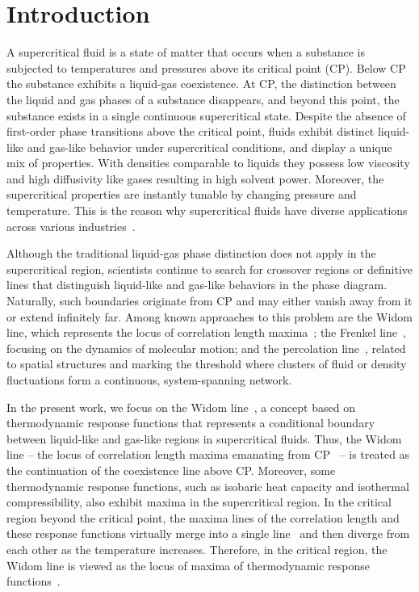 \section{Introduction}
A supercritical fluid is a state of matter that occurs when a substance is subjected to temperatures and pressures above its critical point (CP). Below CP the substance exhibits a liquid-gas coexistence. At CP, the distinction between the liquid and gas phases of a substance disappears, and beyond this point, the substance exists in a single continuous supercritical state. Despite the absence of first-order phase transitions above the critical point, fluids exhibit distinct liquid-like and gas-like behavior under supercritical conditions, and display a unique mix of properties. With densities comparable to liquids they possess low viscosity and high diffusivity like gases resulting in high solvent power. Moreover, the supercritical properties are instantly tunable by changing pressure and temperature. This is the reason why supercritical fluids have diverse applications across various industries~\cite{KMLetal14}.

Although the traditional liquid-gas phase distinction does not apply in the supercritical region, scientists continue to search for crossover regions or definitive lines that distinguish liquid-like and gas-like behaviors in the phase diagram. Naturally, such boundaries originate from CP and may either vanish away from it or extend infinitely far. Among known approaches to this problem are the Widom line, which represents the locus of correlation length maxima~\cite{FW69}; the Frenkel line~\cite{BGMetal17}, focusing on the dynamics of molecular motion; and the percolation line~\cite{CKS01}, related to spatial structures and marking the threshold where clusters of fluid or density fluctuations form a continuous, system-spanning network.

In the present work, we focus on the Widom line~\cite{XKBetal05,MS10,AKM17}, a concept based on thermodynamic response functions that represents a conditional boundary between liquid-like and gas-like regions in supercritical fluids. Thus, the Widom line \--- the locus of correlation length maxima emanating from CP~\cite{XKBetal05} \--- is treated as the continuation of the coexistence line above CP. Moreover, some thermodynamic response functions, such as isobaric heat capacity and isothermal compressibility, also exhibit maxima in the supercritical region. In the critical region beyond the critical point, the maxima lines of the correlation length and these response functions virtually merge into a single line~\cite{AKM17} and then diverge from each other as the temperature increases. Therefore, in the critical region, the Widom line is viewed as the locus of maxima of thermodynamic response functions~\cite{Proctor20}.

